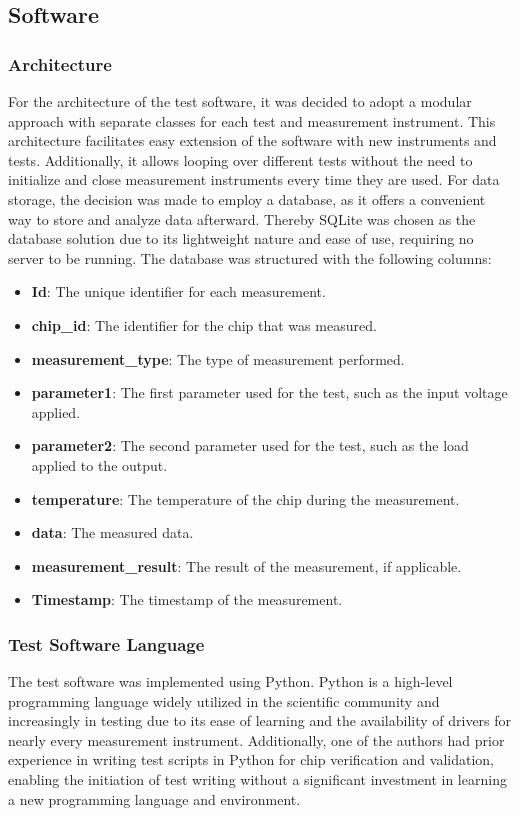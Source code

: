 

\subsection{Software}

\subsubsection{Architecture}
For the architecture of the test software, it was decided to adopt a modular approach with separate classes for each test and measurement instrument. This architecture facilitates easy extension of the software with new instruments and tests. Additionally, it allows looping over different tests without the need to initialize and close measurement instruments every time they are used. For data storage, the decision was made to employ a database, as it offers a convenient way to store and analyze data afterward. Thereby SQLite was chosen as the database solution due to its lightweight nature and ease of use, requiring no server to be running. The database was structured with the following columns:
\begin{itemize}
    \item \textbf{Id}: The unique identifier for each measurement.
    \item \textbf{chip\_id}: The identifier for the chip that was measured.
    \item \textbf{measurement\_type}: The type of measurement performed.
    \item \textbf{parameter1}: The first parameter used for the test, such as the input voltage applied.
    \item \textbf{parameter2}: The second parameter used for the test, such as the load applied to the output.
    \item \textbf{temperature}: The temperature of the chip during the measurement.
    \item \textbf{data}: The measured data.
    \item \textbf{measurement\_result}: The result of the measurement, if applicable.
    \item \textbf{Timestamp}: The timestamp of the measurement.
\end{itemize}

\subsubsection{Test Software Language}
The test software was implemented using Python. Python is a high-level programming language widely utilized in the scientific community and increasingly in testing due to its ease of learning and the availability of drivers for nearly every measurement instrument\cite{Wikipedia:Python}. Additionally, one of the authors had prior experience in writing test scripts in Python for chip verification and validation, enabling the initiation of test writing without a significant investment in learning a new programming language and environment.

